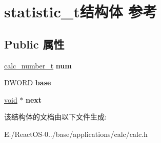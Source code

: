 \hypertarget{structstatistic__t}{}\section{statistic\+\_\+t结构体 参考}
\label{structstatistic__t}
\subsection*{Public 属性}
\begin{DoxyCompactItemize}
\item 
\mbox{\label{structstatistic__t_a63c55cbe8bc27a3953c0d7cc48cbf4ec}} 
\hyperlink{unioncalc__number__t}{calc\+\_\+number\+\_\+t} {\bfseries num}
\item 
\mbox{\label{structstatistic__t_ac4b76f7bbc47fc4b6eb070d304bf5bdc}} 
D\+W\+O\+RD {\bfseries base}
\item 
\mbox{\label{structstatistic__t_a6f469778bf9151f591800eb1a8731021}} 
\hyperlink{interfacevoid}{void} $\ast$ {\bfseries next}
\end{DoxyCompactItemize}


该结构体的文档由以下文件生成\+:\begin{DoxyCompactItemize}
\item 
E\+:/\+React\+O\+S-\/0../base/applications/calc/calc.\+h\end{DoxyCompactItemize}
